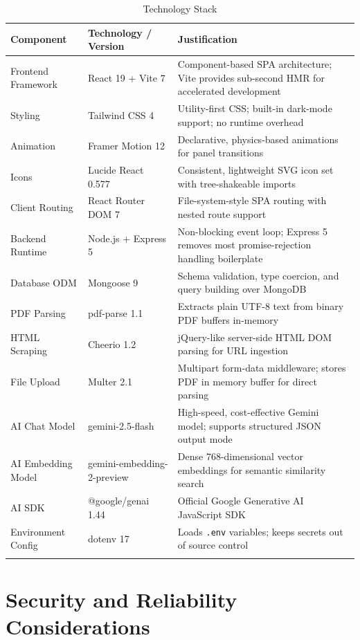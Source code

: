 \documentclass[12pt,a4paper]{report}
\begin{document}
\begin{longtable}{@{}p{3.2cm} p{2.8cm} p{7.2cm}@{}}
\toprule
\textbf{Component} & \textbf{Technology / Version} & \textbf{Justification} \\
\midrule
\endhead
Frontend Framework & React 19 + Vite 7 & Component-based SPA architecture; Vite provides sub-second HMR for accelerated development \\
Styling & Tailwind CSS 4 & Utility-first CSS; built-in dark-mode support; no runtime overhead \\
Animation & Framer Motion 12 & Declarative, physics-based animations for panel transitions \\
Icons & Lucide React 0.577 & Consistent, lightweight SVG icon set with tree-shakeable imports \\
Client Routing & React Router DOM 7 & File-system-style SPA routing with nested route support \\
Backend Runtime & Node.js + Express 5 & Non-blocking event loop; Express 5 removes most promise-rejection handling boilerplate \\
Database ODM & Mongoose 9 & Schema validation, type coercion, and query building over MongoDB \\
PDF Parsing & pdf-parse 1.1 & Extracts plain UTF-8 text from binary PDF buffers in-memory \\
HTML Scraping & Cheerio 1.2 & jQuery-like server-side HTML DOM parsing for URL ingestion \\
File Upload & Multer 2.1 & Multipart form-data middleware; stores PDF in memory buffer for direct parsing \\
AI Chat Model & gemini-2.5-flash & High-speed, cost-effective Gemini model; supports structured JSON output mode \\
AI Embedding Model & gemini-embedding-2-preview & Dense 768-dimensional vector embeddings for semantic similarity search \\
AI SDK & @google/genai 1.44 & Official Google Generative AI JavaScript SDK \\
Environment Config & dotenv 17 & Loads \texttt{.env} variables; keeps secrets out of source control \\
\bottomrule
\caption{Technology Stack}
\label{tab:techstack}
\end{longtable}

\section{Security and Reliability Considerations}
\end{document}
